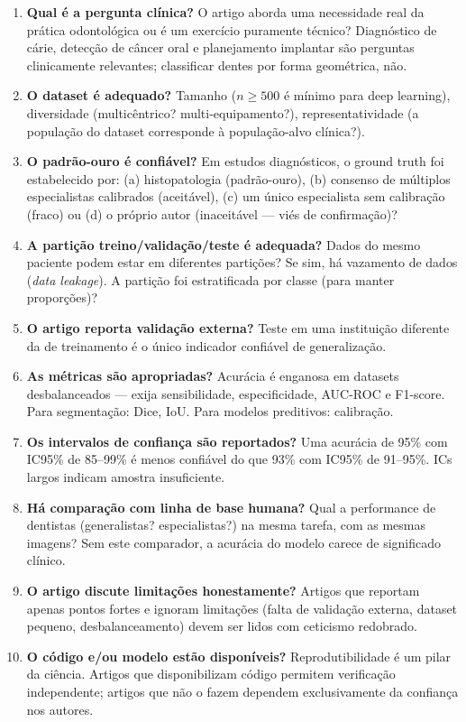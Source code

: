 \begin{enumerate}
    \item \textbf{Qual é a pergunta clínica?} O artigo aborda uma necessidade real da prática odontológica ou é um exercício puramente técnico? Diagnóstico de cárie, detecção de câncer oral e planejamento implantar são perguntas clinicamente relevantes; classificar dentes por forma geométrica, não.
    
    \item \textbf{O dataset é adequado?} Tamanho ($n \geq 500$ é mínimo para deep learning), diversidade (multicêntrico? multi-equipamento?), representatividade (a população do dataset corresponde à população-alvo clínica?).
    
    \item \textbf{O padrão-ouro é confiável?} Em estudos diagnósticos, o ground truth foi estabelecido por: (a) histopatologia (padrão-ouro), (b) consenso de múltiplos especialistas calibrados (aceitável), (c) um único especialista sem calibração (fraco) ou (d) o próprio autor (inaceitável — viés de confirmação)?
    
    \item \textbf{A partição treino/validação/teste é adequada?} Dados do mesmo paciente podem estar em diferentes partições? Se sim, há vazamento de dados (\textit{data leakage}). A partição foi estratificada por classe (para manter proporções)?
    
    \item \textbf{O artigo reporta validação externa?} Teste em uma instituição diferente da de treinamento é o único indicador confiável de generalização.
    
    \item \textbf{As métricas são apropriadas?} Acurácia é enganosa em datasets desbalanceados — exija sensibilidade, especificidade, AUC-ROC e F1-score. Para segmentação: Dice, IoU. Para modelos preditivos: calibração.
    
    \item \textbf{Os intervalos de confiança são reportados?} Uma acurácia de 95\% com IC95\% de 85--99\% é menos confiável do que 93\% com IC95\% de 91--95\%. ICs largos indicam amostra insuficiente.
    
    \item \textbf{Há comparação com linha de base humana?} Qual a performance de dentistas (generalistas? especialistas?) na mesma tarefa, com as mesmas imagens? Sem este comparador, a acurácia do modelo carece de significado clínico.
    
    \item \textbf{O artigo discute limitações honestamente?} Artigos que reportam apenas pontos fortes e ignoram limitações (falta de validação externa, dataset pequeno, desbalanceamento) devem ser lidos com ceticismo redobrado.
    
    \item \textbf{O código e/ou modelo estão disponíveis?} Reprodutibilidade é um pilar da ciência. Artigos que disponibilizam código permitem verificação independente; artigos que não o fazem dependem exclusivamente da confiança nos autores.
\end{enumerate}

